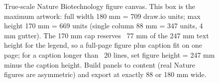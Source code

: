 \documentclass[pdflatex,sn-nature,Numbered,iicol]{sn-jnl}
\begin{document}
\begin{figure}[p]
\centering
{}
\caption{True-scale Nature Biotechnology figure canvas. This box is the maximum
artwork: full width 180 mm = 709 draw.io units; max height 170 mm = 669 units
(single column 88 mm = 347 units, 4 mm gutter). The 170 mm cap reserves ~77 mm of
the 247 mm text height for the legend, so a full-page figure plus caption fit on
one page; for a caption longer than ~20 lines, set figure height = 247 mm minus
the caption height. Build panels to content (real Nature figures are asymmetric)
and export at exactly 88 or 180 mm wide.}
\label{fig:proto}
\end{figure}
\end{document}

